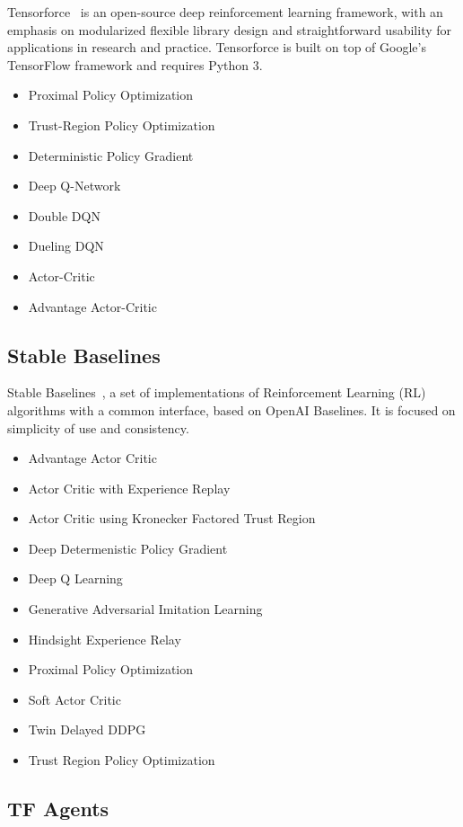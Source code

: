 \documentclass[letterpaper, 10 pt]{IEEEconf}
\begin{document}
Tensorforce~\cite{tensorforce} is an open-source deep reinforcement
learning framework, with an emphasis on modularized flexible library
design and straightforward usability for applications in research and
practice. Tensorforce is built on top of Google's TensorFlow framework
and requires Python 3.


\begin{itemize}
\item Proximal Policy Optimization
\item Trust-Region Policy Optimization
\item Deterministic Policy Gradient
\item Deep Q-Network
\item Double DQN
\item Dueling DQN
\item Actor-Critic
\item Advantage Actor-Critic
\end{itemize}

\subsection{Stable Baselines}

Stable Baselines~\cite{stable-baselines}, a set of implementations of
Reinforcement Learning (RL) algorithms with a common interface, based
on OpenAI Baselines. It is focused on simplicity of use and
consistency.

\begin{itemize}
\item Advantage Actor Critic
\item Actor Critic with Experience Replay
\item Actor Critic using Kronecker Factored Trust Region
\item Deep Determenistic Policy Gradient
\item Deep Q Learning
\item Generative Adversarial Imitation Learning
\item Hindsight Experience Relay
\item Proximal Policy Optimization
\item Soft Actor Critic
\item Twin Delayed DDPG
\item Trust Region Policy Optimization
\end{itemize}

\subsection{TF Agents}
\end{document}
